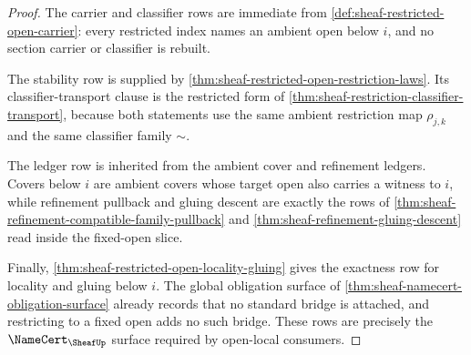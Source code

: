 \begin{proof}
The carrier and classifier rows are immediate from \autoref{def:sheaf-restricted-open-carrier}: every restricted index names an ambient open below $i$, and no section carrier or classifier is rebuilt.

The stability row is supplied by \autoref{thm:sheaf-restricted-open-restriction-laws}. Its classifier-transport clause is the restricted form of \autoref{thm:sheaf-restriction-classifier-transport}, because both statements use the same ambient restriction map $\rho_{j,k}$ and the same classifier family $\sim$.

The ledger row is inherited from the ambient cover and refinement ledgers. Covers below $i$ are ambient covers whose target open also carries a witness to $i$, while refinement pullback and gluing descent are exactly the rows of \autoref{thm:sheaf-refinement-compatible-family-pullback} and \autoref{thm:sheaf-refinement-gluing-descent} read inside the fixed-open slice.

Finally, \autoref{thm:sheaf-restricted-open-locality-gluing} gives the exactness row for locality and gluing below $i$. The global obligation surface of \autoref{thm:sheaf-namecert-obligation-surface} already records that no standard bridge is attached, and restricting to a fixed open adds no such bridge. These rows are precisely the $\NameCert_{\SheafUp}$ surface required by open-local consumers.
\end{proof}
